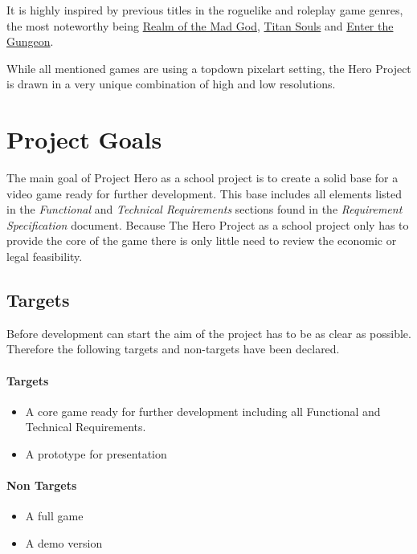 \documentclass[11pt]{article}
\begin{document}
It is highly inspired by previous titles in the roguelike and roleplay game genres, the most noteworthy being \href{https://realmofthemadgod.com}{Realm of the Mad God}, \href{http://www.devolverdigital.com/games/view/titan-souls}{Titan Souls} and \href{http://dodgeroll.com/gungeon/}{Enter the Gungeon}.

While all mentioned games are using a topdown pixelart setting, the Hero Project is drawn in a very unique combination of high and low resolutions.

\newpage

\section{Project Goals}
The main goal of Project Hero as a school project is to create a solid base for a video game ready for further development.
This base includes all elements listed in the \textit{Functional} and \textit{Technical Requirements} sections found in the \textit{Requirement Specification} document.
Because The Hero Project as a school project only has to provide the core of the game there is only little need to review the economic or legal feasibility.

\subsection{Targets}
Before development can start the aim of the project has to be as clear as possible. Therefore the following targets and non-targets have been declared.
\paragraph{Targets}
\begin{itemize}
 \item A core game ready for further development including all Functional and Technical Requirements.
 \item A prototype for presentation
\end{itemize}

\paragraph{Non Targets}
\begin{itemize}
 \item A full game
 \item A demo version
\end{itemize}

\newpage
\end{document}
